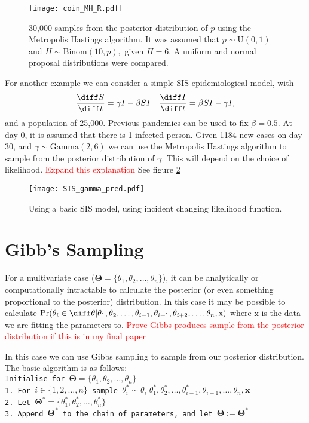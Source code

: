 \begin{figure}[htbp]
    \centering
    \texttt{[image: coin\_MH\_R.pdf]}
    \caption{30,000 samples from the posterior distribution of $p$ using the Metropolis Hastings algorithm. It was assumed that $p\sim \mathrm{U}(0,1)$ and $H \sim \mathrm{Binom}(10, p),$ given $H = 6.$ A uniform and normal proposal distributions were compared.}
    \label{fig:coin_R}
\end{figure}

For another example we can consider a simple SIS epidemiological model, 
with 
$$
\frac{\diff S}{\diff t} 
= \gamma I - \beta SI \quad \frac{\diff I}{\diff t}
 = \beta SI -  \gamma I,
$$
and a population of 25,000. Previous pandemics can be used to fix 
$\beta = 0.5.$ At day 0, it is assumed that there is 1 infected person. 
Given 1184 new cases on day 30, and $\gamma\sim \mathrm{Gamma}(2, 6)$ we can 
use the Metropolis Hastings algorithm to sample from the posterior 
distribution of $\gamma.$  This will depend on the choice of likelihood.
\textcolor{red}{Expand this explanation} See figure \ref{fig:SIS_MH_R}

\begin{figure}[htbp]
    \centering
    \texttt{[image: SIS\_gamma\_pred.pdf]}
    \caption{Using a basic SIS model, using incident changing likelihood function.}
    \label{fig:SIS_MH_R}
\end{figure}

\section{Gibb's Sampling}

For a multivariate case ($\mathbf{\Theta} = \{\theta_1, \theta_2, \dots, \theta_n\}$), it can be analytically or computationally intractable to calculate the posterior (or even something proportional to the posterior) distribution. In this case it may be possible to calculate $\Pr(\theta_i\in\diff\theta|\theta_1, \theta_2, \dots, \theta_{i - 1}, \theta_{i+1}, \theta_{i+2}, \dots, \theta_n, \mathrm{x})$ where $\mathrm{x}$ is the data we are fitting the parameters to.
\textcolor{red}{Prove Gibbs produces sample from the posterior distribution if this is in my final paper}

In this case we can use Gibbs sampling to sample from our posterior distribution. The basic algorithm is as follows:
\texttt{\\
    Initialise for $\mathbf{\Theta} = \{\theta_1, \theta_2, \dots, \theta_n\}$\\
    1. For $i\in\{1, 2, \dots, n\}$ sample $\theta_i^* \sim \theta_i|\theta_1^*, \theta_2^*, \dots, \theta_{i-1}^*, \theta_{i+1}, \dots, \theta_n, \mathbf{x}$\\
    2. Let $\mathbf{\Theta}^* = \{\theta_1^*, \theta_2^*, \dots, \theta_n^*\}$\\
    3. Append $\mathbf{\Theta}^*$ to the chain of parameters, and let $\mathbf{\Theta} := \mathbf{\Theta}^*$
}


